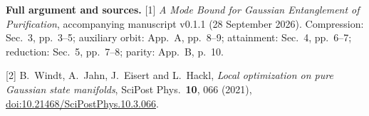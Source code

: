 \documentclass[11pt,a4paper]{article}
\begin{document}
\vspace{3pt}
{\small
\textbf{Full argument and sources.}
[1] \emph{A Mode Bound for Gaussian Entanglement of Purification}, accompanying manuscript v0.1.1 (28 September 2026). Compression: Sec.~3, pp.~3--5; auxiliary orbit: App.~A, pp.~8--9; attainment: Sec.~4, pp.~6--7; reduction: Sec.~5, pp.~7--8; parity: App.~B, p.~10.

[2] B.~Windt, A.~Jahn, J.~Eisert and L.~Hackl, \emph{Local optimization on pure Gaussian state manifolds}, SciPost Phys.~\textbf{10}, 066 (2021), \href{https://doi.org/10.21468/SciPostPhys.10.3.066}{doi:10.21468/SciPostPhys.10.3.066}.

}
\end{document}
